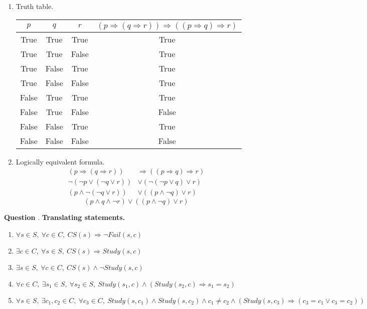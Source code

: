 \documentclass{article}
\newcounter{qcount}
\newcommand\q{\stepcounter{qcount} \textbf{Question \theqcount}. }
\begin{document}
\begin{enumerate}[label= (\alph*)]
\begin{enumerate}[label= (\roman*)]
            \item Truth table.
                \begin{center}
                    \begin{tabular}{|c c c c|}                   
                \hline
                $p $ & $q$ & $r$ & $(p \Rightarrow (q \Rightarrow r)) \Rightarrow ( (p \Rightarrow q) \Rightarrow r)$\\
                \hline
                True & True & True & True \\
                True & True & False & True \\
                True & False & True & True \\
                True & False & False & True \\
                False & True & True & True \\ 
                False & True & False & False \\
                False & False & True & True \\
                False & False & False & False \\
                \hline                      
                    \end{tabular}
                \end{center}
            \item Logically equivalent formula.
                \begin{align*}
                    (p \Rightarrow (q \Rightarrow r)) &\Rightarrow ( (p \Rightarrow q) \Rightarrow r) \\
                    \neg(\neg p \lor (\neg q \lor r)) &\lor (\neg (\neg p \lor q) \lor r) \\
                    (p \land \neg (\neg q \lor r)) &\lor ((p \land \neg q) \lor r) 
                \end{align*}
                $$\boxed{(p \land q \land \neg r) \lor ((p \land \neg q )
                \lor r)}$$
        \end{enumerate}
\end{enumerate}

\newpage
\q \textbf{Translating statements.}
\begin{enumerate}[label=(\alph*)]
    \item $\forall s \in S, \: \forall c \in C, \:  CS(s) \Rightarrow \neg Fail(s, c)$ 
    \item $\exists c \in C, \: \forall s \in S, \: CS(s) \Rightarrow Study(s, c)$
    \item $\exists s \in S, \: \forall c \in C, \: CS(s) \land \neg Study(s, c)$
    \item $\forall c \in C, \: \exists s_1 \in S, \: \forall s_2 \in S, \:
        Study(s_1, c) \land (Study(s_2, c) \Rightarrow s_1 = s_2)$
    \item $\forall s \in S, \: \exists c_1, c_2 \in C, \: \forall c_3 \in C, \:
        Study(s, c_1) \land Study(s, c_2) \land c_1 \neq c_2 \land (Study (s, c_3)
        \Rightarrow (c_3 = c_1 \lor c_3 = c_2)) $
\end{enumerate}
\end{document}
